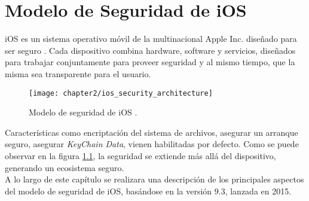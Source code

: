 \chapter{Modelo de Seguridad de iOS}
iOS es un sistema operativo móvil de la multinacional Apple Inc. diseñado para ser
seguro \cite{asg}. Cada dispositivo combina hardware, software y servicios, diseñados para trabajar
conjuntamente para proveer seguridad y al mismo tiempo, que la misma sea transparente para el
usuario.
\begin{figure}[htbp]
    \centering
    \texttt{[image: chapter2/ios\_security\_architecture]}
    \caption{Modelo de seguridad de iOS \cite{asg}.} 
    \label{fig:ch02:security-architecture}
\end{figure}
Características como encriptación del sistema de archivos, asegurar un arranque seguro, asegurar
\textit{KeyChain Data}, vienen habilitadas por defecto. Como se puede observar en la figura \ref{fig:ch02:security-architecture}, la seguridad se extiende más allá del dispositivo, generando un ecosistema seguro.\\
A lo largo de este capítulo se realizara una descripción de los principales aspectos del modelo de seguridad de iOS, basándose en la versión 9.3, lanzada en 2015.
